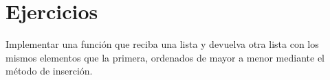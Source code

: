 \newpage
\section{Ejercicios}

\begin{ejercicio}
Implementar una función que reciba una lista y devuelva otra lista con los
mismos elementos que la primera, ordenados de mayor a menor mediante el método
de inserción.
\end{ejercicio}
